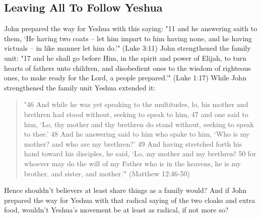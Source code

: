 \documentclass[11pt]{article}
\begin{document}
\subsection{Leaving All To Follow Yeshua} \label{leaving all to follow yeshua}
John prepared the way for Yeshua with this saying:
"11 and he answering saith to them, `He having two coats -- let him impart to him having none, and he having victuals -- in like manner let him do.'" (Luke 3:11) John strengthened the family unit: "17 and he shall go before Him, in the spirit and power of Elijah, to turn hearts of fathers unto children, and disobedient ones to the wisdom of righteous ones, to make ready for the Lord, a people prepared.'" (Luke 1:17) While John strengthened the family unit Yeshua extended it: 
\begin{quote}
"46 And while he was yet speaking to the multitudes, lo, his mother and brethren had stood without, seeking to speak to him, 47 and one said to him, `Lo, thy mother and thy brethren do stand without, seeking to speak to thee.' 48 And he answering said to him who spake to him, `Who is my mother? and who are my brethren?' 49 And having stretched forth his hand toward his disciples, he said, `Lo, my mother and my brethren! 50 for whoever may do the will of my Father who is in the heavens, he is my brother, and sister, and mother.'" (Matthew 12:46-50)
\end{quote}
Hence shouldn't believers at least share things as a family would? And if John prepared the way for Yeshua with that radical saying of the two cloaks and extra food, wouldn't Yeshua's movement be at least as radical, if not more so? 
\end{document}
